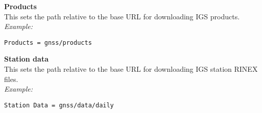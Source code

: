 {\bfseries Products}\\
This sets the path relative to the base URL for downloading IGS products.\\
\textit{Example:}
\begin{lstlisting}
Products = gnss/products
\end{lstlisting}

{\bfseries Station data}\\
This sets the path relative to the base URL for downloading IGS station RINEX files. \\
\textit{Example:}
\begin{lstlisting}
Station Data = gnss/data/daily
\end{lstlisting}
